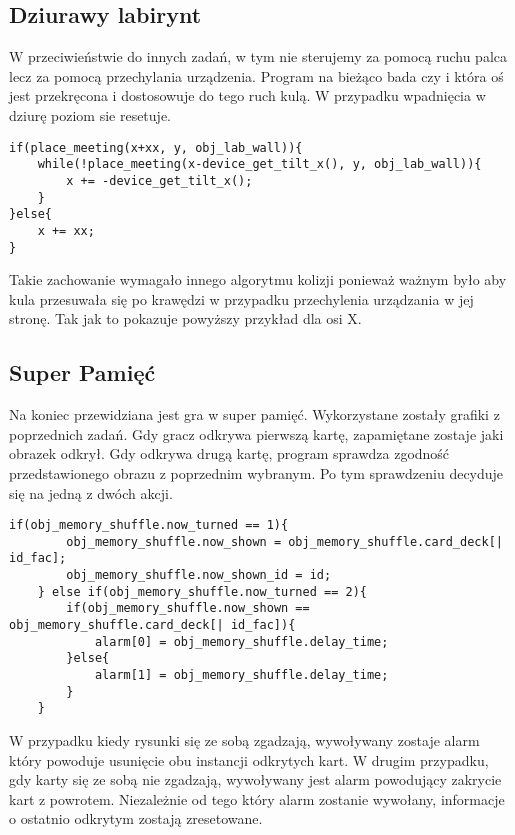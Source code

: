 \documentclass[openright]{xmgr}
\begin{document}
\subsection{Dziurawy labirynt}
W przeciwieństwie do innych zadań, w tym nie sterujemy za pomocą ruchu palca lecz za pomocą przechylania urządzenia. Program na bieżąco bada czy i która oś jest przekręcona i dostosowuje do tego ruch kulą. W przypadku wpadnięcia w dziurę poziom sie resetuje. 

\begin{lstlisting}[caption={Fragment kodu obiektu obj\_player\_ball}]
if(place_meeting(x+xx, y, obj_lab_wall)){
    while(!place_meeting(x-device_get_tilt_x(), y, obj_lab_wall)){
        x += -device_get_tilt_x();
    }
}else{
    x += xx;
}
\end{lstlisting}

 Takie zachowanie wymagało innego algorytmu kolizji ponieważ ważnym było aby kula przesuwała się po krawędzi w przypadku przechylenia urządzania w jej stronę. Tak jak to pokazuje powyższy przykład dla osi X. 


\subsection{Super Pamięć}
Na koniec przewidziana jest gra w super pamięć. Wykorzystane zostały grafiki z poprzednich zadań. Gdy gracz odkrywa pierwszą kartę, zapamiętane zostaje jaki obrazek odkrył. Gdy odkrywa drugą kartę, program sprawdza zgodność przedstawionego obrazu z poprzednim wybranym. Po tym sprawdzeniu decyduje się na jedną z dwóch akcji.

\begin{lstlisting}[caption={Fragment kodu obiektu obj\_memory\_card}]
    if(obj_memory_shuffle.now_turned == 1){
        obj_memory_shuffle.now_shown = obj_memory_shuffle.card_deck[| id_fac];
        obj_memory_shuffle.now_shown_id = id;
    } else if(obj_memory_shuffle.now_turned == 2){
        if(obj_memory_shuffle.now_shown == obj_memory_shuffle.card_deck[| id_fac]){
            alarm[0] = obj_memory_shuffle.delay_time;
        }else{
            alarm[1] = obj_memory_shuffle.delay_time;
        }
    }
\end{lstlisting}

W przypadku kiedy rysunki się ze sobą zgadzają, wywoływany zostaje alarm który powoduje usunięcie obu instancji odkrytych kart. W drugim przypadku, gdy karty się ze sobą nie zgadzają, wywoływany jest alarm powodujący zakrycie kart z powrotem. Niezależnie od tego który alarm zostanie wywołany, informacje o ostatnio odkrytym zostają zresetowane.
\end{document}
